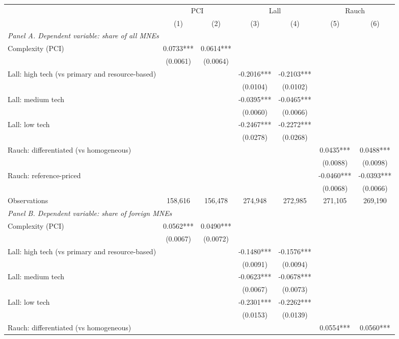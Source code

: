 \begin{tabular}{lcccccc} \hline
 & \multicolumn{2}{c}{PCI} & \multicolumn{2}{c}{Lall} & \multicolumn{2}{c}{Rauch} \\
 & (1) & (2) & (3) & (4) & (5) & (6) \\ \hline
\multicolumn{7}{l}{\textit{Panel A. Dependent variable: share of all MNEs}} \\
Complexity (PCI) & 0.0733*** & 0.0614*** &  &  &  &  \\
 & (0.0061) & (0.0064) &  &  &  &  \\
Lall: high tech (vs primary and resource-based) &  &  & -0.2016*** & -0.2103*** &  &  \\
 &  &  & (0.0104) & (0.0102) &  &  \\
Lall: medium tech &  &  & -0.0395*** & -0.0465*** &  &  \\
 &  &  & (0.0060) & (0.0066) &  &  \\
Lall: low tech &  &  & -0.2467*** & -0.2272*** &  &  \\
 &  &  & (0.0278) & (0.0268) &  &  \\
Rauch: differentiated (vs homogeneous) &  &  &  &  & 0.0435*** & 0.0488*** \\
 &  &  &  &  & (0.0088) & (0.0098) \\
Rauch: reference-priced &  &  &  &  & -0.0460*** & -0.0393*** \\
 &  &  &  &  & (0.0068) & (0.0066) \\
Observations & 158,616 & 156,478 & 274,948 & 272,985 & 271,105 & 269,190 \\
\midrule
\multicolumn{7}{l}{\textit{Panel B. Dependent variable: share of foreign MNEs}} \\
Complexity (PCI) & 0.0562*** & 0.0490*** &  &  &  &  \\
 & (0.0067) & (0.0072) &  &  &  &  \\
Lall: high tech (vs primary and resource-based) &  &  & -0.1480*** & -0.1576*** &  &  \\
 &  &  & (0.0091) & (0.0094) &  &  \\
Lall: medium tech &  &  & -0.0623*** & -0.0678*** &  &  \\
 &  &  & (0.0067) & (0.0073) &  &  \\
Lall: low tech &  &  & -0.2301*** & -0.2262*** &  &  \\
 &  &  & (0.0153) & (0.0139) &  &  \\
Rauch: differentiated (vs homogeneous) &  &  &  &  & 0.0554*** & 0.0560*** \\

\end{tabular}
